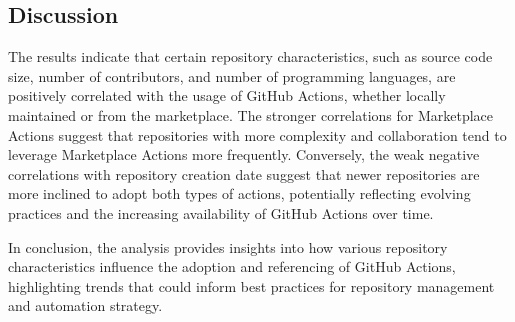 \documentclass[conference]{IEEEtran}
\begin{document}
      \subsection{Discussion}
      The results indicate that certain repository characteristics, such as source code size, number of contributors, and number of programming languages, are positively correlated with the usage of GitHub Actions, whether locally maintained or from the marketplace. The stronger correlations for Marketplace Actions suggest that repositories with more complexity and collaboration tend to leverage Marketplace Actions more frequently. Conversely, the weak negative correlations with repository creation date suggest that newer repositories are more inclined to adopt both types of actions, potentially reflecting evolving practices and the increasing availability of GitHub Actions over time.
      
      In conclusion, the analysis provides insights into how various repository characteristics influence the adoption and referencing of GitHub Actions, highlighting trends that could inform best practices for repository management and automation strategy.
    
\end{document}

